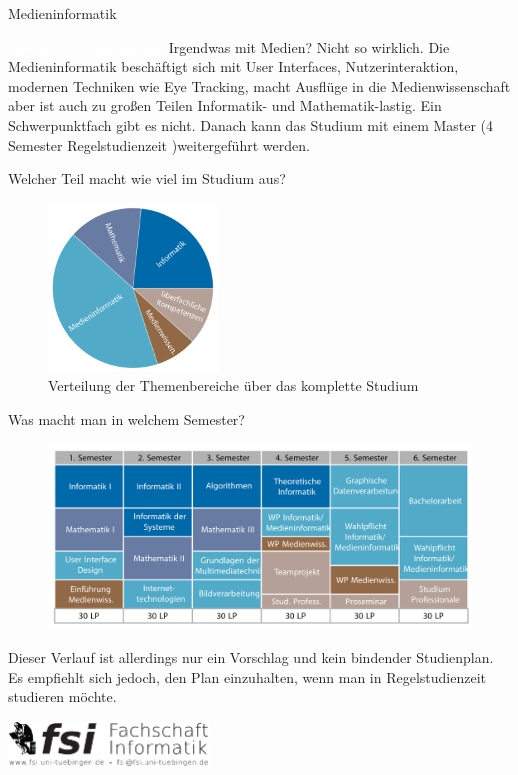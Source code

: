 	\begin{Huge}
			Medieninformatik
		\end{Huge}
		\begin{exampleblock}{\textcolor{white}{Was ist der Studiengang?}}
			Irgendwas mit Medien? Nicht so wirklich. Die Medieninformatik beschäftigt sich mit User Interfaces, Nutzerinteraktion, modernen Techniken wie Eye Tracking, macht Ausflüge in die Medienwissenschaft aber ist auch zu großen Teilen Informatik- und Mathematik-lastig. Ein Schwerpunktfach gibt es nicht. Danach kann das Studium mit einem Master (4 Semester Regelstudienzeit )weitergeführt werden.
		\end{exampleblock}
	
	\begin{block}{Welcher Teil macht wie viel im Studium aus?}
		\begin{figure}[h!]
			\includegraphics[width=0.4\textwidth]{charts/medieninformatik-Piechart.pdf}
			\caption{Verteilung der Themenbereiche über das komplette Studium}
		\end{figure}
	\end{block}
	
	\begin{block}{Was macht man in welchem Semester?}
		\begin{figure}[h!]
			\includegraphics[width=\textwidth]{charts/medieninformatik-Studienplan_abWS18.pdf}
		\end{figure}
		Dieser Verlauf ist allerdings nur ein Vorschlag und kein bindender Studienplan. Es empfiehlt sich jedoch, den Plan einzuhalten, wenn man in Regelstudienzeit studieren möchte.
	\end{block}
\vfill
\begin{flushright}
	\includegraphics[width=0.4\textwidth]{fsilogo.pdf}
\end{flushright}